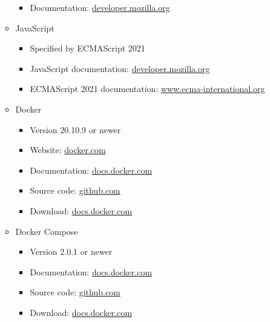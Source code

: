 \documentclass{scrreprt}
\begin{document}
\begin{itemize}
\begin{itemize}
\begin{itemize}
            \item \gls{Documentation}: \href{https://developer.mozilla.org/en-US/docs/Web/CSS}{developer.mozilla.org}
        
        \end{itemize}

        \item \gls{JavaScript}
        \begin{itemize}

            \item Specified by \gls{ECMAScript} 2021
            \item \gls{JavaScript} \gls{documentation}: \href{https://developer.mozilla.org/en-US/docs/Web/JavaScript}{developer.mozilla.org}
            \item \gls{ECMAScript} 2021 \gls{documentation}: \href{https://www.ecma-international.org/wp-content/uploads/ECMA-262_12th_edition_june_2021.pdf}{www.ecma-international.org}

        \end{itemize}
        
        \item \gls{Docker}
        \begin{itemize}
        
            \item Version 20.10.9 or newer
            \item Website: \href{https://www.docker.com/}{docker.com}
            \item \gls{Documentation}: \href{https://docs.docker.com/get-started/overview/}{docs.docker.com}
            \item Source code: \href{https://github.com/moby/moby}{github.com}
            \item Download: \href{https://docs.docker.com/get-docker/}{docs.docker.com}
        
        \end{itemize}
        
        \item \gls{Docker Compose}
        \begin{itemize}
        
            \item Version 2.0.1 or newer
            \item \gls{Documentation}: \href{https://docs.docker.com/compose/}{docs.docker.com}
            \item Source code: \href{https://github.com/docker/compose}{github.com}
            \item Download: \href{https://docs.docker.com/compose/install/}{docs.docker.com}
        

\end{itemize}
\end{itemize}
\end{itemize}
\end{document}
